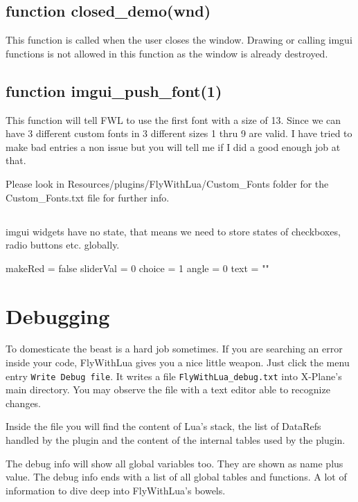 \documentclass[11pt,parskip=half,a4paper]{scrartcl}
\begin{document}
\subsection{function closed\_demo(wnd)}

This function is called when the user closes the window. Drawing or calling imgui functions is not allowed in this function as the window is already destroyed.

\subsection{function imgui\_push\_font(1)}

This function will tell FWL to use the first font with a size of 13. Since we can have 3 different custom fonts in 3 different sizes 1 thru 9 are valid. I have tried to make bad entries a non issue but you will tell me if I did a good enough job at that.

Please look in Resources/plugins/FlyWithLua/Custom\_Fonts folder for the Custom\_Fonts.txt file for further info.

\subsection{}
imgui widgets have no state, that means we need to store states of checkboxes, radio buttons etc. globally.

makeRed = false
\newline
sliderVal = 0
\newline
choice = 1
\newline
angle = 0
\newline
text = ""


\newpage
\section{Debugging}

To domesticate the beast is a hard job sometimes. If you are searching an error inside your code, FlyWithLua gives you a nice little weapon. Just click the menu entry \verb|Write Debug file|. It writes a file \verb|FlyWithLua_debug.txt| into X-Plane's main directory. You may observe the file with a text editor able to recognize changes.

Inside the file you will find the content of Lua's stack, the list of DataRefs handled by the plugin and the content of the internal tables used by the plugin.

The debug info will show all global variables too. They are shown as name plus value. The debug info ends with a list of all global tables and functions. A lot of information to dive deep into FlyWithLua's bowels.
\end{document}
